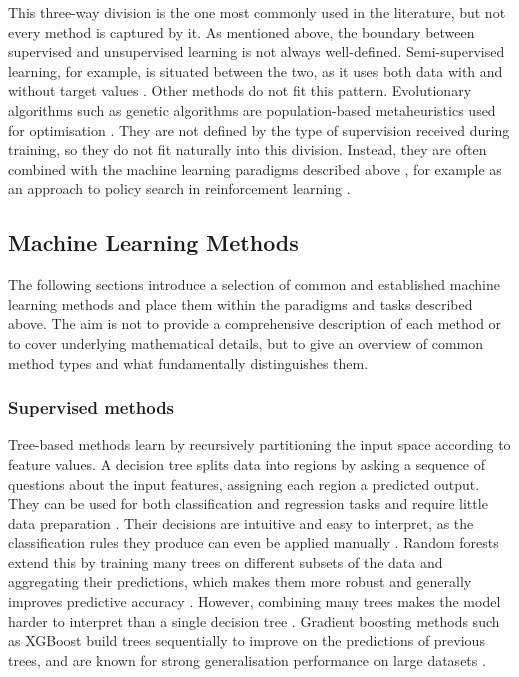 This three-way division is the one most commonly used in the 
literature, but not every method is captured by it. As mentioned above, 
the boundary 
between supervised and unsupervised learning is not always 
well-defined. Semi-supervised learning, for example, is situated 
between the two, as it uses both data with and without target values 
\parencite{engelen2020semi_supervised}. Other methods do not fit this pattern. 
Evolutionary algorithms such as genetic algorithms are
population-based metaheuristics used for optimisation
\parencite{corne2025_ea}. They are not defined by the type of
supervision received during training, so they do not fit naturally
into this division. Instead, they are 
often combined with the machine learning paradigms described above 
\parencite{zhang2025_mh_ml}, for example as an approach to policy 
search in reinforcement learning \parencite{moriarty1999_ea_rl}.

\subsection{Machine Learning Methods}
\label{sec:machine-learning-methods}

The following sections introduce a selection of common and established machine learning 
methods and place them within the paradigms and tasks described above. 
The aim is not to provide a comprehensive description of each method or 
to cover underlying mathematical details, but to give an overview of 
common method types and what fundamentally distinguishes them. 

\subsubsection*{Supervised methods}

Tree-based methods learn by recursively partitioning the input space 
according to feature values. A decision tree splits data into regions 
by asking a sequence of questions about the input features, assigning 
each region a predicted output. They can be used for both 
classification and regression tasks and require little data 
preparation
\parencites[Chapter~6]{geron2019hands_on_machine_learning}{sarker2021machine_learning_algorithms_real_world_applications_research_directions}. 
Their decisions are intuitive and easy to interpret, as the 
classification rules they produce can even be applied manually 
\parencite[Chapter~6]{geron2019hands_on_machine_learning}.
Random forests extend this by training many trees on different 
subsets of the data and aggregating their predictions, which makes 
them more robust and generally improves predictive accuracy 
\parencite{breiman2001random_forests}. 
However, combining many trees makes the model harder to interpret 
than a single decision tree 
\parencite[Chapter~6]{geron2019hands_on_machine_learning}. 
Gradient boosting methods such as XGBoost build trees sequentially 
to improve on the predictions of previous trees, and are known for 
strong generalisation performance on large datasets
\parencite{chen2016xgboost,
sarker2021machine_learning_algorithms_real_world_applications_research_directions}.

